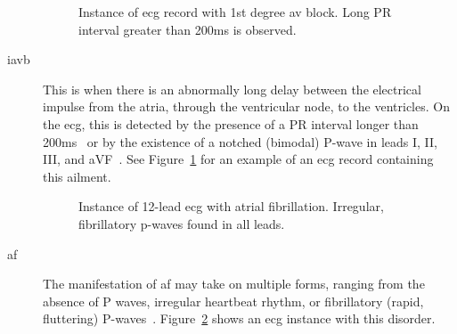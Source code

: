 \documentclass[\main/thesis.tex]{subfiles}
\begin{document}
\begin{description}

    \begin{figure}[ht]
        \centering
        \caption{Instance of \gls{ecg} record with 1st degree av block. Long PR interval greater than 200ms is observed.}
        \label{fig:full_IAVB}
    \end{figure}
    \item[\gls{iavb}] This is when there is an abnormally long delay between the electrical impulse from the atria, through the ventricular node, to the ventricles. On the \gls{ecg}, this is detected by the presence of a PR interval longer than 200ms~\cite{carroz_pseudo-pacemaker_2010} or by the existence of a notched (bimodal) P-wave in leads I, II, III, and aVF~\cite{bayes_de_luna_diagnosis_2017}. See Figure~\ref{fig:full_IAVB} for an example of an \gls{ecg} record containing this ailment.

    \begin{figure}[ht]
        \centering
        \caption{Instance of 12-lead \gls{ecg} with atrial fibrillation. Irregular, fibrillatory p-waves found in all leads.}
        \label{fig:full_AF}
    \end{figure}
    \item[\gls{af}] The manifestation of \gls{af} may take on multiple forms, ranging from the absence of P waves, irregular heartbeat rhythm, or fibrillatory (rapid, fluttering) P-waves~\cite{podrid2001cardiac,afib-ecg}. Figure~\ref{fig:full_AF} shows an \gls{ecg} instance with this disorder.


\end{description}
\end{document}

